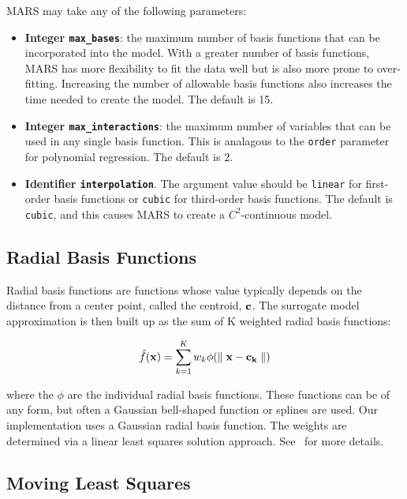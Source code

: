 \documentclass{article}
\begin{document}
MARS may take any of the following parameters:
\begin{itemize}
\item {\bf Integer \texttt{max\_bases}}: the maximum number of basis functions that can be incorporated into the model.  With a greater number of basis functions, MARS has more flexibility to fit the data well but is also more prone to over-fitting.  Increasing the number of allowable basis functions also increases the time needed to create the model.  The default is 15.
\item {\bf Integer \texttt{max\_interactions}}: the maximum number of variables that can be used in any single basis function.  This is analagous to the \texttt{order} parameter for polynomial regression.  The default is 2.
\item {\bf Identifier \texttt{interpolation}}.  The argument value should be \texttt{linear} for first-order basis functions or \texttt{cubic} for third-order basis functions.  The default is \texttt{cubic}, and this causes MARS to create a $C^2$-continuous model.
\end{itemize}

\subsection{Radial Basis Functions}\label{models:surf:rbf}

Radial basis functions are functions whose value typically depends on the 
distance from a center point, called the centroid, ${\bf c}$. 
The surrogate model approximation is then built up as the sum of K 
weighted radial basis functions: 

\begin{equation}
  \hat{f}({\bf x})=\sum_{k=1}^{K}w_{k}\phi({\parallel {\bf x} - {\bf c_{k}} \parallel})
  \label{models:surf:equation11}  
\end{equation}

where the $\phi$ are the individual radial basis functions.  
These functions can be of any form, but often a Gaussian bell-shaped 
function or splines are used.  
Our implementation uses a Gaussian radial basis function. 
The weights are determined via a linear least squares solution approach.
See~\cite{orr} for more details.

\subsection{Moving Least Squares}\label{models:surf:mls}
\end{document}
